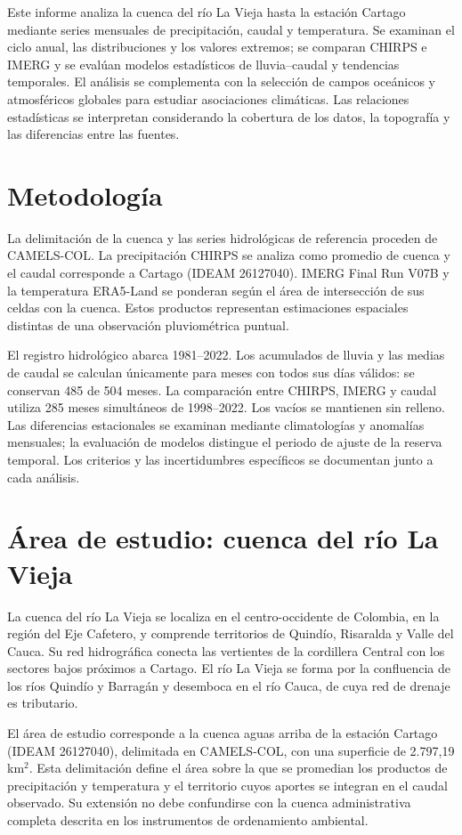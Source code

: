 \documentclass[10pt,a4paper]{article}
\begin{document}
Este informe analiza la cuenca del río La Vieja hasta la estación Cartago mediante series mensuales de precipitación, caudal y temperatura. Se examinan el ciclo anual, las distribuciones y los valores extremos; se comparan CHIRPS e IMERG y se evalúan modelos estadísticos de lluvia–caudal y tendencias temporales. El análisis se complementa con la selección de campos oceánicos y atmosféricos globales para estudiar asociaciones climáticas. Las relaciones estadísticas se interpretan considerando la cobertura de los datos, la topografía y las diferencias entre las fuentes.
\section*{Metodología}
La delimitación de la cuenca y las series hidrológicas de referencia proceden de CAMELS-COL. La precipitación CHIRPS se analiza como promedio de cuenca y el caudal corresponde a Cartago (IDEAM 26127040). IMERG Final Run V07B y la temperatura ERA5-Land se ponderan según el área de intersección de sus celdas con la cuenca. Estos productos representan estimaciones espaciales distintas de una observación pluviométrica puntual.

El registro hidrológico abarca 1981–2022. Los acumulados de lluvia y las medias de caudal se calculan únicamente para meses con todos sus días válidos: se conservan 485 de 504 meses. La comparación entre CHIRPS, IMERG y caudal utiliza 285 meses simultáneos de 1998–2022. Los vacíos se mantienen sin relleno. Las diferencias estacionales se examinan mediante climatologías y anomalías mensuales; la evaluación de modelos distingue el periodo de ajuste de la reserva temporal. Los criterios y las incertidumbres específicos se documentan junto a cada análisis.
\clearpage
\section*{Área de estudio: cuenca del río La Vieja}
La cuenca del río La Vieja se localiza en el centro-occidente de Colombia, en la región del Eje Cafetero, y comprende territorios de Quindío, Risaralda y Valle del Cauca. Su red hidrográfica conecta las vertientes de la cordillera Central con los sectores bajos próximos a Cartago. El río La Vieja se forma por la confluencia de los ríos Quindío y Barragán y desemboca en el río Cauca, de cuya red de drenaje es tributario.

El área de estudio corresponde a la cuenca aguas arriba de la estación Cartago (IDEAM 26127040), delimitada en CAMELS-COL, con una superficie de 2.797,19 km$^2$. Esta delimitación define el área sobre la que se promedian los productos de precipitación y temperatura y el territorio cuyos aportes se integran en el caudal observado. Su extensión no debe confundirse con la cuenca administrativa completa descrita en los instrumentos de ordenamiento ambiental.
\end{document}
